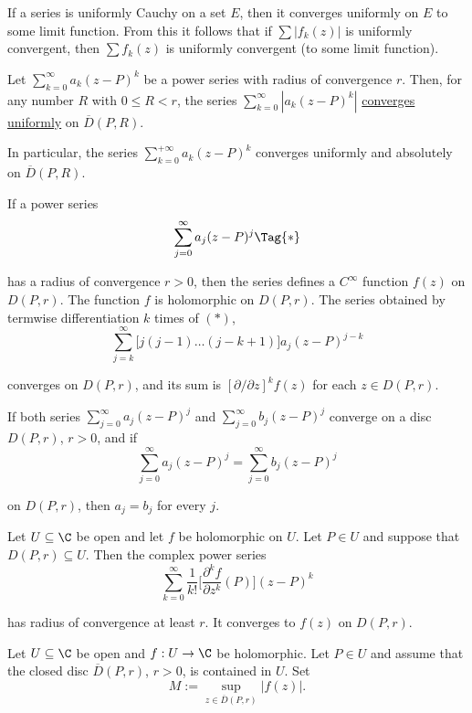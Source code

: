 If a series is uniformly Cauchy on a set $E$, then it converges uniformly on
$E$ to some limit function. From this it follows that if $\sum|f_k(z)|$ is
uniformly convergent, then $\sum f_k(z)$ is uniformly convergent (to some limit
function).

\label{ec076c1}

Let $\sum_{k=0}^\infty a_k(z-P)^k$ be a power series with radius of convergence
$r$. Then, for any number $R$ with $0\leq R<r$, the series
$\sum_{k=0}^\infty|a_k(z-P)^k|$ \href{bba67e4}{converges uniformly} on
$\overline D(P,R)$.

In particular, the series $\sum_{k=0}^{+\infty}a_k(z-P)^k$ converges uniformly
and absolutely on $\overline D(P,R)$.

\label{ccf2595}

If a power series
\begin{equation*}
  \sum_{j=0}^\infty a_j(z-P)^j\Tag{*}
\end{equation*}

has a radius of convergence $r>0$, then the series defines a $C^\infty$
function $f(z)$ on $D(P,r)$. The function $f$ is holomorphic on $D(P,r)$. The
series obtained by termwise differentiation $k$ times of $(*)$,
$$
  \sum_{j=k}^\infty\Big[j(j-1)\ldots(j-k+1)\Big]a_j(z-P)^{j-k}
$$

converges on $D(P,r)$, and its sum is $[\partial/\partial z]^kf(z)$ for each
$z\in D(P,r)$.

\label{ea8c930}

If both series $\sum_{j=0}^\infty a_j(z-P)^j$ and $\sum_{j=0}^\infty
b_j(z-P)^j$ converge on a disc $D(P,r)$, $r>0$, and if
$$
  \sum_{j=0}^\infty a_j(z-P)^j=\sum_{j=0}^\infty b_j(z-P)^j
$$

on $D(P,r)$, then $a_j=b_j$ for every $j$.

\label{b43209d}

Let $U\subseteq\C$ be open and let $f$ be holomorphic on $U$. Let $P\in U$ and
suppose that $D(P,r)\subseteq U$. Then the complex power series
$$
  \sum_{k=0}^\infty\frac1{k!}\bigg[\frac{\partial^kf}{\partial z^k}(P)\bigg](z-P)^k
$$

has radius of convergence at least $r$. It converges to $f(z)$ on $D(P,r)$.

\label{a2d8611}

Let $U\subseteq\C$ be open and $f:U\to\C$ be holomorphic. Let $P\in U$ and
assume that the closed disc $\overline D(P,r)$, $r>0$, is contained in $U$. Set
$$
  M:=\sup_{z\in\overline D(P,r)}|f(z)|.
$$

